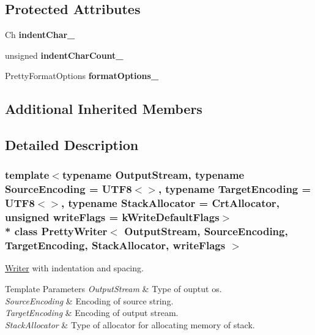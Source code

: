 \subsection*{Protected Attributes}
\begin{DoxyCompactItemize}
\item 
Ch {\bfseries indent\+Char\+\_\+}\hypertarget{a00232_aaa3f6380daa8466a5101ed18fc33bf04}{}\label{a00232_aaa3f6380daa8466a5101ed18fc33bf04}

\item 
unsigned {\bfseries indent\+Char\+Count\+\_\+}\hypertarget{a00232_a7d00b9716ef3cd7e34ae1b744c968f13}{}\label{a00232_a7d00b9716ef3cd7e34ae1b744c968f13}

\item 
Pretty\+Format\+Options {\bfseries format\+Options\+\_\+}\hypertarget{a00232_a15505ed4ea0fa85d339b3a987f1a3aaf}{}\label{a00232_a15505ed4ea0fa85d339b3a987f1a3aaf}

\end{DoxyCompactItemize}
\subsection*{Additional Inherited Members}


\subsection{Detailed Description}
\subsubsection*{template$<$typename Output\+Stream, typename Source\+Encoding = U\+T\+F8$<$$>$, typename Target\+Encoding = U\+T\+F8$<$$>$, typename Stack\+Allocator = Crt\+Allocator, unsigned write\+Flags = k\+Write\+Default\+Flags$>$\\*
class Pretty\+Writer$<$ Output\+Stream, Source\+Encoding, Target\+Encoding, Stack\+Allocator, write\+Flags $>$}

\hyperlink{a00335}{Writer} with indentation and spacing. 


\begin{DoxyTemplParams}{Template Parameters}
{\em Output\+Stream} & Type of ouptut os. \\
\hline
{\em Source\+Encoding} & Encoding of source string. \\
\hline
{\em Target\+Encoding} & Encoding of output stream. \\
\hline
{\em Stack\+Allocator} & Type of allocator for allocating memory of stack. \\
\hline
\end{DoxyTemplParams}


